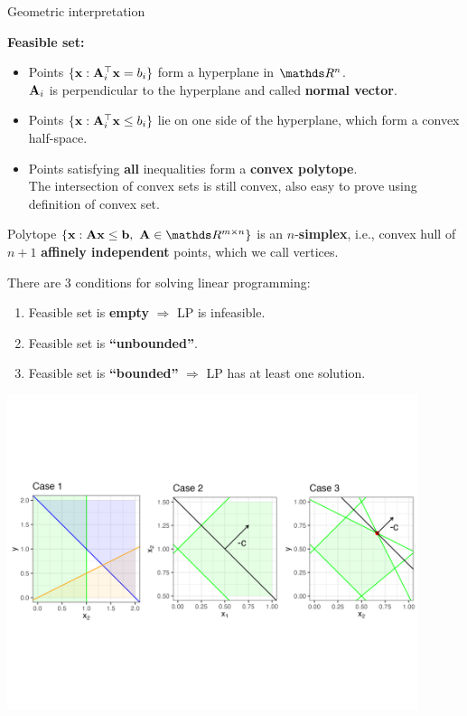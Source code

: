 \documentclass[11pt,compress,t,notes=noshow, xcolor=table]{beamer}
\begin{document}
\begin{vbframe}{Geometric interpretation}
    
\textbf{Feasible set:}
\begin{itemize}
    \setlength{\itemsep}{1em}
    \item Points $\{\mathbf{x}: \mathbf{A}_i^\top \mathbf{x} = b_i\}$ form a hyperplane in $\R^n$.\\
          $\mathbf{A}_i$ is perpendicular to the hyperplane and called \textbf{normal vector}.
    \item Points $\{\mathbf{x}: \mathbf{A}_i^\top \mathbf{x} \le b_i\}$ lie on one side of the hyperplane, which form a convex half-space.
    \item Points satisfying \textbf{all} inequalities form a \textbf{convex polytope}.\\
          The intersection of convex sets is still convex, also easy to prove using definition of convex set.
\end{itemize}

\lz

Polytope $\{\xv: \Amat \xv \le \mathbf{b},\ \Amat \in \R^{m \times n}\}$ is an $n$-\textbf{simplex}, i.e., 
convex hull of $n + 1$ \textbf{affinely independent} points, which we call vertices.

\framebreak

There are 3 conditions for solving linear programming:
\begin{enumerate}
\item Feasible set is \textbf{empty} $\Rightarrow$ LP is infeasible.
\item Feasible set is \textbf{\enquote{unbounded}}.
\item Feasible set is \textbf{\enquote{bounded}} $\Rightarrow$ LP has at least one solution.
\end{enumerate}

\begin{center}
    \includegraphics[width=0.9\textwidth]{figure_man/cons-solutions-lp.png}
\end{center}


\end{vbframe}
\end{document}
